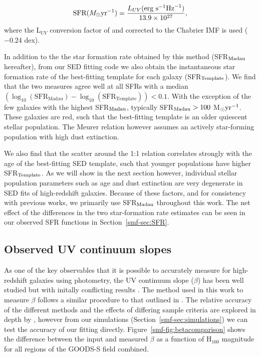 \begin{equation}\label{eq:sfr}
  \textup{SFR} (M_{\odot} \textup{yr}^{-1}) = 
    \frac{L_{UV} (\textup{erg s}^{-1} \textup{Hz}^{-1})} {13.9 \times 10^{27}} ,
\end{equation}
where the L$_{UV}$ conversion factor of \citet{Madau:1998jd} and \citet{KennicuttJr:1998id} corrected to the Chabrier IMF is used ($-0.24$ dex).

In addition to the the star formation rate obtained by this method (SFR$_{\rm{Madau}}$ hereafter), from our SED fitting code we also obtain the instantaneous star formation rate of the best-fitting template for each galaxy (SFR$_{\rm{Template}}$). We find that the two measures agree well at all SFRs with a median$(\log_{10}(\text{SFR}_{\text{Madau}}) - \log_{10}(\text{SFR}_{\text{Template}})) < 0.1$. With the exception of the few galaxies with the highest SFR$_{\rm{Madau}}$, typically SFR$_{\rm{Madau}} > 100$ M$_{\odot} \textup{yr}^{-1}$. These galaxies are red, such that the best-fitting template is an older quiescent stellar population. The Meurer relation however assumes an actively star-forming population with high dust extinction.

We also find that the scatter around the 1:1 relation correlates strongly with the age of the best-fitting SED template, such that younger populations have higher SFR$_{\rm{Template}}$. As we will show in the next section however, individual stellar population parameters such as age and dust extinction are very degenerate in SED fits of high-redshift galaxies. Because of these factors, and for consistency with previous works, we primarily use SFR$_{\rm{Madau}}$ throughout this work. The net effect of the differences in the two star-formation rate estimates can be seen in our observed SFR functions in Section~\ref{smf-sec:SFR}.


\subsection{Observed UV continuum slopes}\label{app:beta}
As one of the key observables that it is possible to accurately measure for high-redshift galaxies using photometry, the UV continuum slope ($\beta$) has been well studied but with initally conflicting results \citep{Dunlop:2011jl,Wilkins:2011fs,2012ApJ...754...83B,Finkelstein:2012hr,2013MNRAS.429.2456R,Bouwens:2013vf}. The method used in this work to measure $\beta$ follows a similar procedure to that outlined in \citet{Finkelstein:2012hr}. The relative accuracy of the different methods and the effects of differing sample criteria are explored in depth by \citet{2013MNRAS.429.2456R}, however from our simulations (Section~\ref{smf-sec:simulations}) we can test the accuracy of our fitting directly. Figure~\ref{smf-fig:betacomparison} shows the difference between the input and measured $\beta$ as a function of H$_{160}$ magnitude for all regions of the GOODS-S field combined.  

